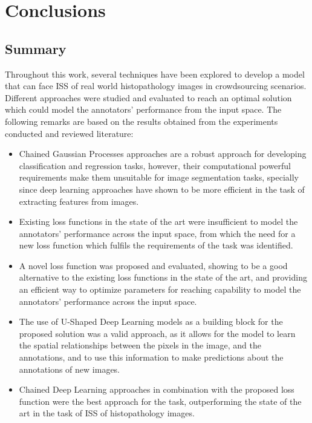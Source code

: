 \chapter{Conclusions}\label{ch:conclusions}

\section{Summary}

Throughout this work, several techniques have been explored to develop a
model that can face \gls{ISS} of real world histopathology images in
crowdsourcing scenarios. Different approaches were studied and evaluated
to reach an optimal solution which could model the annotators' performance
from the input space. The following remarks are based on the results
obtained from the experiments conducted and reviewed literature:

\begin{itemize}
  \item Chained Gaussian Processes approaches are a robust approach
    for developing classification and regression tasks, however,
    their computational powerful requirements make them unsuitable
    for image segmentation tasks, specially since deep learning approaches
    have shown to be more efficient in the task of extracting features
    from images.
  \item Existing loss functions in the state of the art were insufficient
    to model the annotators' performance across the input space, from
    which the need for a new loss function which fulfils the requirements
    of the task was identified.
  \item A novel loss function was proposed and evaluated, showing to
    be a good alternative to the existing loss functions in the state
    of the art, and providing an efficient way to optimize parameters
    for reaching capability to model the annotators' performance
    across the input space.
  \item The use of U-Shaped Deep Learning models as a building block
    for the proposed solution was a valid approach, as it allows for
    the model to learn the spatial relationships between the pixels
    in the image, and the annotations, and to use this information to
    make predictions about the annotations of new images.
  \item Chained Deep Learning approaches in combination with the
    proposed loss function were the best approach for the task, outperforming
    the state of the art in the task of \gls{ISS} of histopathology images.
\end{itemize}

